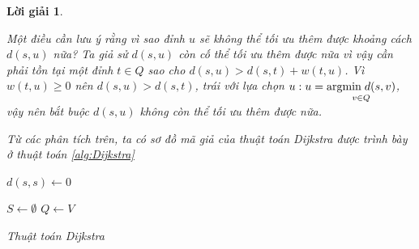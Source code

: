 \documentclass[14pt, a4paper]{article}
\theoremstyle{sltheorem}
\theoremstyle{soltheorem}
\newtheorem*{loigiai}{Lời giải}
\begin{document}
\begin{loigiai}
\begin{itemize}
\begin{itemize}
                Một điều cần lưu ý rằng vì sao đỉnh $u$ sẽ không thể tối ưu thêm được khoảng cách $d(s, u)$ nữa?
                Ta giả sử $d(s, u)$ còn cố thể tối ưu thêm được nữa vì vậy cần phải tồn tại một đỉnh $t \in Q$ sao cho $d(s, u) > d(s, t) + w(t, u)$.
                Vì $w(t, u) \geq 0$ nên $d(s, u) > d(s, t)$, trái với lựa chọn $u: u = \underset{v \in Q}{\mathrm{argmin} \thickspace d(s, v)}$,
                vậy nên bắt buộc $d(s, u)$ không còn thể tối ưu thêm được nữa.

                Từ các phân tích trên, ta có sơ đồ mã giả của thuật toán Dijkstra được trình bày ở thuật toán \ref{alg:Dijkstra}
                \begin{algorithm}[h!]
                    \DontPrintSemicolon

                    $d(s, s) \gets 0$\;

                    $S \gets \emptyset$\;
                    $Q \gets V$\;

                    \;
                    \caption{Thuật toán Dijkstra}
                    \label{alg:Dijkstra}
                \end{algorithm}


\end{itemize}
\end{itemize}
\end{loigiai}
\end{document}
